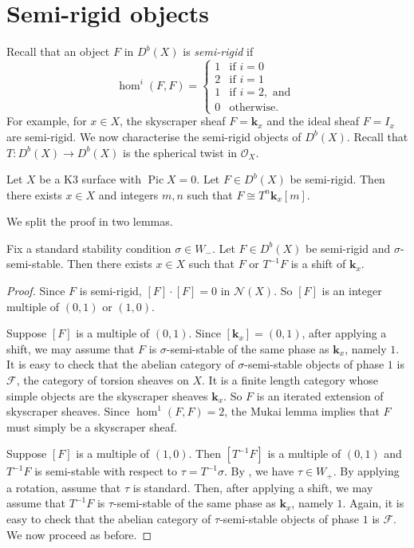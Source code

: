 \documentclass{amsart}
\begin{document}
\section{Semi-rigid objects}\label{sec:semirigid}
Recall that an object \(F\) in \(D^b(X)\) is \emph{semi-rigid} if
\[ \hom^{i}(F,F) =
  \begin{cases}
     1 & \text{if } i = 0\\
    2 &\text{if } i = 1\\
    1 &\text{if } i = 2, \text{ and }\\
    0 &\text{otherwise}.
  \end{cases}
\]
For example, for \(x \in X\), the skyscraper sheaf \(F = \mathbf{k}_x\)  and the ideal sheaf \(F = I_x\) are semi-rigid.
We now characterise the semi-rigid objects of \(D^b(X)\).
Recall that \(T \colon D^b(X) \to D^b(X)\) is the spherical twist in \(\mathcal{O}_{X}\).
\begin{proposition}\label{prop:semirigids}
  Let \(X\) be a K3 surface with \(\operatorname{Pic} X = 0\).
  Let \(F \in D^b(X)\) be semi-rigid.
  Then there exists \(x \in X\) and integers \(m, n\)  such that \(F \cong T^n \mathbf{k}_x[m]\).
\end{proposition}
We split the proof in two lemmas.
\begin{lemma}\label{lem:semistable-semirigid}
  Fix a standard stability condition \(\sigma \in W_-\).
  Let \(F \in D^b(X)\) be semi-rigid and \(\sigma\)-semi-stable.
  Then there exists \(x \in X\) such that \(F\) or \(T^{-1}F\) is a shift of \(\mathbf{k}_x\).
\end{lemma}
\begin{proof}
  Since \(F\) is semi-rigid, \([F]\cdot[F] = 0\) in \(\mathcal{N}(X)\).
  So \([F]\) is an integer multiple of \((0,1)\) or \((1,0)\).

  Suppose \([F]\) is a multiple of \((0,1)\).
  Since \([\mathbf{k}_x] = (0,1)\), after applying a shift, we may assume that \(F\) is \(\sigma\)-semi-stable of the same phase as \(\mathbf{k}_x\), namely \(1\).
  It is easy to check that the abelian category of \(\sigma\)-semi-stable objects of phase \(1\) is \(\mathcal F\), the category of torsion sheaves on \(X\).
  It is a finite length category whose simple objects are the skyscraper sheaves \(\mathbf{k}_x\).
  So \(F\) is an iterated extension of skyscraper sheaves.
  Since \(\hom^1(F,F) = 2\), the Mukai lemma \cite[Lemma~2.7]{huy.mac.ste:08} implies that \(F\) must simply be a skyscraper sheaf.
  
  Suppose \([F]\) is a multiple of \((1,0)\).
  Then \([T^{-1}F]\) is a multiple of \((0,1)\) and \(T^{-1}F\) is semi-stable with respect to \(\tau = T^{-1}\sigma\).
  By , we have \(\tau \in W_{+}\).
  By applying a rotation, assume that \(\tau\) is standard.
  Then, after applying a shift, we may assume that \(T^{-1}F\) is \(\tau\)-semi-stable of the same phase as \(\mathbf{k}_x\), namely \(1\).
  Again, it is easy to check that the abelian category of \(\tau\)-semi-stable objects of phase \(1\) is \(\mathcal{F}\).
  We now proceed as before.  
\end{proof}
\end{document}
